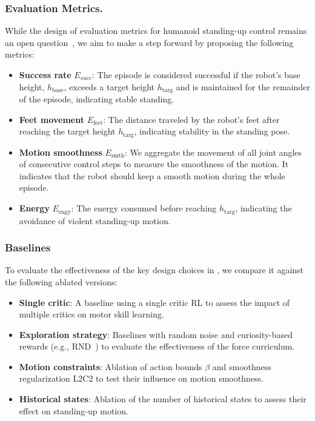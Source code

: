 \subsubsection{Evaluation Metrics.} While the design of evaluation metrics for humanoid standing-up control remains an open question~\cite{subburaman2023survey}, we aim to make a step forward by proposing the following metrics: 
\begin{itemize}[leftmargin=4mm]
\vspace{-0.02in}
\item \textbf{Success rate} $E_{succ}$: The episode is considered successful if the robot's base height, $h_{\mathrm{base}}$, exceeds a target height $h_\mathrm{targ}$ and is maintained for the remainder of the episode, indicating stable standing. 
\item \textbf{Feet movement} $E_{\mathrm{feet}}$: The distance traveled by the robot's feet after reaching the target height $h_\mathrm{targ}$, indicating stability in the standing pose. 
\item \textbf{Motion smoothness} $E_{\mathrm{smth}}$: We aggregate the movement of all joint angles of consecutive control steps to measure the smoothness of the motion. It indicates that the robot should keep a smooth motion during the whole episode. 
\item \textbf{Energy} $E_{\mathrm{engy}}$: The energy consumed before reaching $h_\mathrm{targ}$, indicating the avoidance of violent standing-up motion. 
\vspace{-0.02in} 
\end{itemize}

\subsubsection{Baselines} To evaluate the effectiveness of the key design choices in \ours, we compare it against the following ablated versions:
\begin{itemize}[leftmargin=4mm]
\vspace{-0.02in}
    \item \textbf{Single critic}: A baseline using a single critic RL to assess the impact of multiple critics on motor skill learning. 
    \item \textbf{Exploration strategy}: Baselines with random noise and curiosity-based rewards (e.g., RND~\cite{burda2019exploration}) to evaluate the effectiveness of the force curriculum. 
    \item \textbf{Motion constraints}: Ablation of action bounds $\beta$ and smoothness regularization L2C2 to test their influence on motion smoothness.
    \item \textbf{Historical states}: Ablation of the number of historical states to assess their effect on standing-up motion.
\vspace{-0.02in}
\end{itemize}
 
